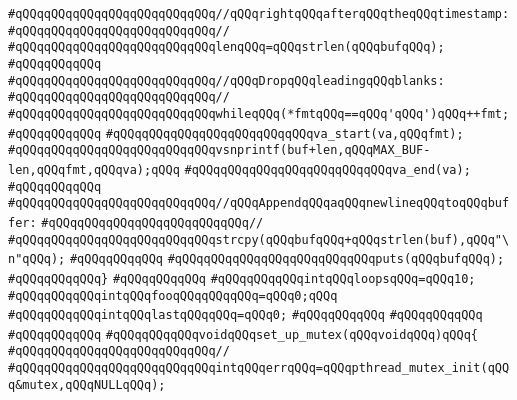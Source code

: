 \verb|#qQQqqQQqqQQqqQQqqQQqqQQqqQQq//qQQqrightqQQqafterqQQqtheqQQqtimestamp:|\newline
\verb|#qQQqqQQqqQQqqQQqqQQqqQQqqQQq//|\newline
\verb|#qQQqqQQqqQQqqQQqqQQqqQQqqQQqlenqQQq=qQQqstrlen(qQQqbufqQQq);|\newline
\verb|#qQQqqQQqqQQq|\newline
\verb|#qQQqqQQqqQQqqQQqqQQqqQQqqQQq//qQQqDropqQQqleadingqQQqblanks:|\newline
\verb|#qQQqqQQqqQQqqQQqqQQqqQQqqQQq//|\newline
\verb|#qQQqqQQqqQQqqQQqqQQqqQQqqQQqwhileqQQq(*fmtqQQq==qQQq'qQQq')qQQq++fmt;|\newline
\verb|#qQQqqQQqqQQq|\newline
\verb|#qQQqqQQqqQQqqQQqqQQqqQQqqQQqva_start(va,qQQqfmt);|\newline
\verb|#qQQqqQQqqQQqqQQqqQQqqQQqqQQqvsnprintf(buf+len,qQQqMAX_BUF-len,qQQqfmt,qQQqva);qQQq|\newline
\verb|#qQQqqQQqqQQqqQQqqQQqqQQqqQQqva_end(va);|\newline
\verb|#qQQqqQQqqQQq|\newline
\verb|#qQQqqQQqqQQqqQQqqQQqqQQqqQQq//qQQqAppendqQQqaqQQqnewlineqQQqtoqQQqbuffer:|\newline
\verb|#qQQqqQQqqQQqqQQqqQQqqQQqqQQq//|\newline
\verb|#qQQqqQQqqQQqqQQqqQQqqQQqqQQqstrcpy(qQQqbufqQQq+qQQqstrlen(buf),qQQq"\n"qQQq);|\newline
\verb|#qQQqqQQqqQQq|\newline
\verb|#qQQqqQQqqQQqqQQqqQQqqQQqqQQqputs(qQQqbufqQQq);|\newline
\verb|#qQQqqQQqqQQq}|\newline
\verb|#qQQqqQQqqQQq|\newline
\verb|#qQQqqQQqqQQqintqQQqloopsqQQq=qQQq10;|\newline
\verb|#qQQqqQQqqQQqintqQQqfooqQQqqQQqqQQq=qQQq0;qQQq|\newline
\verb|#qQQqqQQqqQQqintqQQqlastqQQqqQQq=qQQq0;|\newline
\verb|#qQQqqQQqqQQq|\newline
\verb|#qQQqqQQqqQQq|\newline
\verb|#qQQqqQQqqQQq|\newline
\verb|#qQQqqQQqqQQqvoidqQQqset_up_mutex(qQQqvoidqQQq)qQQq{|\newline
\verb|#qQQqqQQqqQQqqQQqqQQqqQQqqQQq//|\newline
\verb|#qQQqqQQqqQQqqQQqqQQqqQQqqQQqintqQQqerrqQQq=qQQqpthread_mutex_init(qQQq&mutex,qQQqNULLqQQq);|\newline
